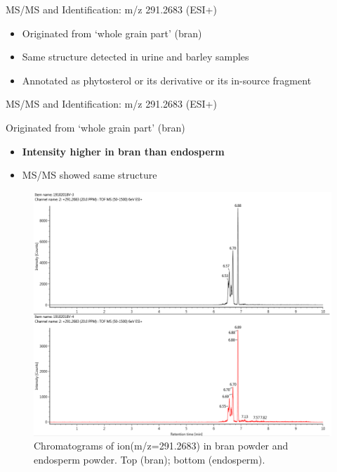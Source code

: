 \documentclass{beamer}
\begin{document}
\begin{frame}{MS/MS and Identification: m/z 291.2683 (ESI+)}
\begin{itemize}
\item Originated from `whole grain part' (bran) 
\item Same structure detected in urine and barley samples
\item Annotated as phytosterol or its derivative or its in-source fragment
\end{itemize}
\end{frame}
\begin{frame}{MS/MS and Identification: m/z 291.2683 (ESI+)}
\begin{block} {Originated from `whole grain part' (bran) }
\begin{itemize}
\item \textbf{Intensity higher in bran than endosperm}
\item MS/MS showed same structure
\end{itemize}
\begin{figure}[H]
    \centering
    \includegraphics[scale=0.25]{images/291pos(p1,p2).png}
    \caption{Chromatograms of ion(m/z=291.2683) in bran powder and endosperm powder. Top (bran); bottom (endosperm).}
    \label{fig:291_barley}
\end{figure}
\end{block}
\end{frame}
\end{document}
